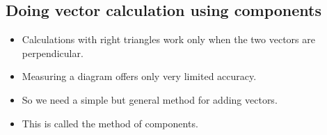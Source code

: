 \documentclass[]{beamer}
\begin{document}
\subsection{Doing vector calculation using components }

  
\begin{frame}
\begin{itemize}
\item Calculations with right triangles work only when the two vectors are perpendicular.
\pause
\item Measuring a diagram offers only very limited accuracy.
\pause
\item So we need a simple but general method for adding vectors.
\pause
\item  This is called the
method of components.
\end{itemize}

\end{frame}

\end{document}
